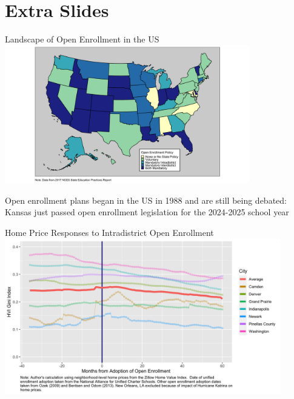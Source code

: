 \documentclass[notes,11pt, aspectratio=169]{beamer}
\newenvironment{wideitemize}{\itemize\addtolength{\itemsep}{10pt}}{\enditemize}
\begin{document}
\section*{Extra Slides}

\appendix

\begin{frame}{Landscape of Open Enrollment in the US} 
\label{map}
\centering
\includegraphics[width=0.8\textwidth]{figures/policies_map.png}
  \begin{wideitemize}
    \item Open enrollment plans began in the US in 1988 and are still being debated: Kansas just passed open enrollment legislation for the 2024-2025 school year \hyperlink{mapback}{}
  \end{wideitemize}
  
\end{frame}

\begin{frame}{Home Price Responses to Intradistrict Open Enrollment}
\label{gini}
\centering
\includegraphics[width=0.9\textwidth]{figures/monthly_gini.png}
\hyperlink{giniback}{}
\end{frame}
\end{document}
